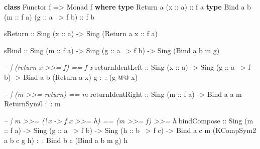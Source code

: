 \documentclass[]{article}
\newenvironment{Shaded}{}{}
\newcommand{\KeywordTok}[1]{\textcolor[rgb]{0.00,0.44,0.13}{\textbf{{#1}}}}
\newcommand{\DataTypeTok}[1]{\textcolor[rgb]{0.56,0.13,0.00}{{#1}}}
\newcommand{\CommentTok}[1]{\textcolor[rgb]{0.38,0.63,0.69}{\textit{{#1}}}}
\newcommand{\OtherTok}[1]{\textcolor[rgb]{0.00,0.44,0.13}{{#1}}}
\newcommand{\FunctionTok}[1]{\textcolor[rgb]{0.02,0.16,0.49}{{#1}}}
\newcommand{\NormalTok}[1]{{#1}}
\begin{document}
\begin{Shaded}
\begin{Highlighting}[]
\KeywordTok{class} \DataTypeTok{Functor} \NormalTok{f }\OtherTok{=>} \DataTypeTok{Monad} \NormalTok{f }\KeywordTok{where}
    \KeywordTok{type} \DataTypeTok{Return} \NormalTok{a   (}\OtherTok{x ::} \NormalTok{a)}\OtherTok{                   ::} \NormalTok{f a}
    \KeywordTok{type} \DataTypeTok{Bind}   \NormalTok{a b (}\OtherTok{m ::} \NormalTok{f a) (}\OtherTok{g ::} \NormalTok{a }\FunctionTok{~>} \NormalTok{f b)}\OtherTok{ ::} \NormalTok{f b}

    \NormalTok{sReturn}
\OtherTok{        ::} \DataTypeTok{Sing} \NormalTok{(}\OtherTok{x ::} \NormalTok{a)}
        \OtherTok{->} \DataTypeTok{Sing} \NormalTok{(}\DataTypeTok{Return} \NormalTok{a}\OtherTok{ x ::} \NormalTok{f a)}

    \NormalTok{sBind}
\OtherTok{        ::} \DataTypeTok{Sing} \NormalTok{(}\OtherTok{m ::} \NormalTok{f a)}
        \OtherTok{->} \DataTypeTok{Sing} \NormalTok{(}\OtherTok{g ::} \NormalTok{a }\FunctionTok{~>} \NormalTok{f b)}
        \OtherTok{->} \DataTypeTok{Sing} \NormalTok{(}\DataTypeTok{Bind} \NormalTok{a b m g)}

    \CommentTok{-- | (return x >>= f) == f x}
    \NormalTok{returnIdentLeft}
\OtherTok{        ::} \DataTypeTok{Sing} \NormalTok{(}\OtherTok{x ::} \NormalTok{a)}
        \OtherTok{->} \DataTypeTok{Sing} \NormalTok{(}\OtherTok{g ::} \NormalTok{a }\FunctionTok{~>} \NormalTok{f b)}
        \OtherTok{->} \DataTypeTok{Bind} \NormalTok{a b (}\DataTypeTok{Return} \NormalTok{a x) g }\FunctionTok{:~:} \NormalTok{(g }\FunctionTok{@@} \NormalTok{x)}

    \CommentTok{-- | (m >>= return) == m}
    \NormalTok{returnIdentRight}
\OtherTok{        ::} \DataTypeTok{Sing} \NormalTok{(}\OtherTok{m ::} \NormalTok{f a)}
        \OtherTok{->} \DataTypeTok{Bind} \NormalTok{a a m }\DataTypeTok{ReturnSym0} \FunctionTok{:~:} \NormalTok{m}

    \CommentTok{-- | m >>= (\textbackslash{}x -> f x >>= h) == (m >>= f) >>= h}
    \NormalTok{bindCompose}
\OtherTok{        ::} \DataTypeTok{Sing} \NormalTok{(}\OtherTok{m ::} \NormalTok{f a)}
        \OtherTok{->} \DataTypeTok{Sing} \NormalTok{(}\OtherTok{g ::} \NormalTok{a }\FunctionTok{~>} \NormalTok{f b)}
        \OtherTok{->} \DataTypeTok{Sing} \NormalTok{(}\OtherTok{h ::} \NormalTok{b }\FunctionTok{~>} \NormalTok{f c)}
        \OtherTok{->} \DataTypeTok{Bind} \NormalTok{a c m (}\DataTypeTok{KCompSym2} \NormalTok{a b c g h) }\FunctionTok{:~:} \DataTypeTok{Bind} \NormalTok{b c (}\DataTypeTok{Bind} \NormalTok{a b m g) h}


\end{Highlighting}
\end{Shaded}
\end{document}
